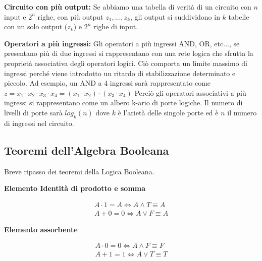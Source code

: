 \begin{defn}
	\textbf{Circuito con più output:}
	Se abbiamo una tabella di verità di un circuito con $ n $ input e $ 2^n $ righe, con più output $ z_1, \dots, z_k $, gli output si suddividono in $ k $ tabelle con un solo output ($ z_k $) e $ 2^n $ righe di input.
\end{defn}

\begin{defn}
	\textbf{Operatori a più ingressi:}
	Gli operatori a più ingressi AND, OR, etc..., se presentano più di due ingressi si rappresentano con una rete logica che sfrutta la proprietà associativa degli operatori logici. Ciò comporta un limite massimo di ingressi perché viene introdotto un ritardo di stabilizzazione determinato e piccolo.
	Ad esempio, un AND a 4 ingressi sarà rappresentato come $ z = x_1 \cdot x_2 \cdot x_3 \cdot x_4 = (x_1 \cdot x_2 ) \cdot (x_3 \cdot x_4)  $
	Perciò gli operatori associativi a più ingressi si rappresentano come un albero k-ario di porte logiche. Il numero di livelli di porte sarà $ log_k(n) $ dove $ k $ è l'arietà delle singole porte ed è $ n $ il numero di ingressi nel circuito.
\end{defn}


\subsection{Teoremi dell'Algebra Booleana}
Breve ripasso dei teoremi della Logica Booleana.

\begin{thm}
	\textbf{Elemento Identità di prodotto e somma}
	
	\begin{equation*}\begin{aligned}
		A \cdot 1 = A \iff A \land T \equiv A \\
		A + 0 = 0 \iff A \lor F \equiv A
	\end{aligned}\end{equation*}
\end{thm}

\begin{thm}
	\textbf{Elemento assorbente}
	
	\begin{equation*}\begin{aligned}
		A \cdot 0 = 0 \iff A \land F \equiv F \\
		A + 1 = 1 \iff A \lor T \equiv T 
	\end{aligned}\end{equation*}
\end{thm}


